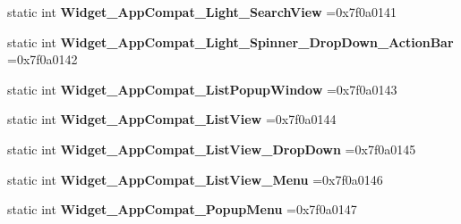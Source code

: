 \begin{DoxyCompactItemize}
\item 
\mbox{\label{classandroid_1_1support_1_1graphics_1_1drawable_1_1R_1_1style_ae86f8ac1560dfdecb0ce45b46b059015}} 
static int {\bfseries Widget\+\_\+\+App\+Compat\+\_\+\+Light\+\_\+\+Search\+View} =0x7f0a0141
\item 
\mbox{\label{classandroid_1_1support_1_1graphics_1_1drawable_1_1R_1_1style_a3cb8226bc2288b02f9d7c88d4b35e085}} 
static int {\bfseries Widget\+\_\+\+App\+Compat\+\_\+\+Light\+\_\+\+Spinner\+\_\+\+Drop\+Down\+\_\+\+Action\+Bar} =0x7f0a0142
\item 
\mbox{\label{classandroid_1_1support_1_1graphics_1_1drawable_1_1R_1_1style_ad3d58eb30e103e46e4f52d225a0559de}} 
static int {\bfseries Widget\+\_\+\+App\+Compat\+\_\+\+List\+Popup\+Window} =0x7f0a0143
\item 
\mbox{\label{classandroid_1_1support_1_1graphics_1_1drawable_1_1R_1_1style_a42871bbe3857eef9006fbc709f317c29}} 
static int {\bfseries Widget\+\_\+\+App\+Compat\+\_\+\+List\+View} =0x7f0a0144
\item 
\mbox{\label{classandroid_1_1support_1_1graphics_1_1drawable_1_1R_1_1style_a4d34ce212df03afd3ee6bb2f6a185dc5}} 
static int {\bfseries Widget\+\_\+\+App\+Compat\+\_\+\+List\+View\+\_\+\+Drop\+Down} =0x7f0a0145
\item 
\mbox{\label{classandroid_1_1support_1_1graphics_1_1drawable_1_1R_1_1style_ab5c68d2a8d1b47023ad90db191bc5de2}} 
static int {\bfseries Widget\+\_\+\+App\+Compat\+\_\+\+List\+View\+\_\+\+Menu} =0x7f0a0146
\item 
\mbox{\label{classandroid_1_1support_1_1graphics_1_1drawable_1_1R_1_1style_a408e6e73d464fefba871c8b2de7ce035}} 
static int {\bfseries Widget\+\_\+\+App\+Compat\+\_\+\+Popup\+Menu} =0x7f0a0147
\item 
\mbox{\label{classandroid_1_1support_1_1graphics_1_1drawable_1_1R_1_1style_a74924dfdb0be55f4efc112708905a7af}} 

\end{DoxyCompactItemize}
